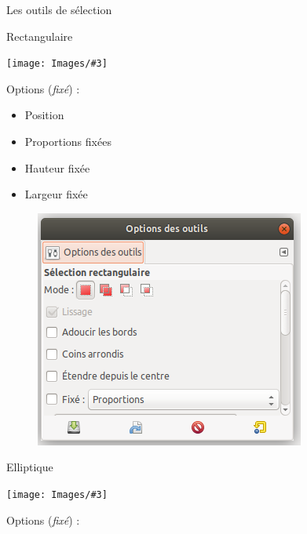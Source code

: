 \documentclass[10pt,svgnames,usenames,table]{beamer}
\newcommand{\tool}[3]{%
	\begin{minipage}{0.40\textwidth}
	\item #1
	\end{minipage}\hfill
	\begin{minipage}{0.20\textwidth}
	\begin{flushright}
	\keys{#2}
	\end{flushright}
	\end{minipage}
	\begin{minipage}{0.06\textwidth}
	\fbox{ou}
	\end{minipage}
	\begin{minipage}{0.1\textwidth}
	\texttt{[image: Images/\#3]}
	\end{minipage}
}
\begin{document}
\begin{frame}[allowframebreaks]{Les outils de sélection}
\begin{enumerate}


	\tool{Rectangulaire}{R}{rectangle.png}

	\vspace{0.5cm}
	\begin{minipage}[t]{0.45\textwidth}
	Options (\textit{fixé}) : 
	
	\begin{itemize}
		\item Position
		\item Proportions fixées
		\item Hauteur fixée
		\item Largeur fixée
	\end{itemize}
	\end{minipage}
	\begin{minipage}[t]{0.45\textwidth}

	\begin{figure}
	    	\centering
	    	\includegraphics[width=\textwidth]{Images/option_outil} 
	\end{figure}
	\end{minipage}

	\framebreak


	\tool{Elliptique}{E}{ellipse.png}

	\vspace{0.5cm}
	\begin{minipage}[t]{0.45\textwidth}
	Options (\textit{fixé}) : 
	

\end{minipage}
\end{enumerate}
\end{frame}
\end{document}
